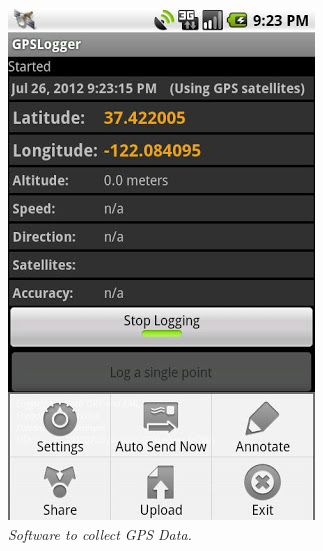 \documentclass[12pt,fullpage,doublespace]{article}
\begin{document}
\begin{figure}
\begin{center}
\includegraphics[scale=0.40]{gpsLogger.png}
\caption{\small \sl Software to collect GPS Data.\label{fig:gpsLogger}}
\end{center}
\end{figure}
\end{document}
